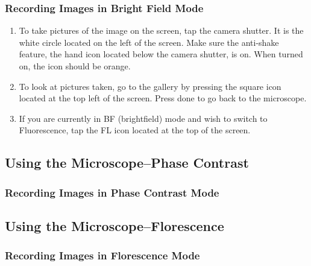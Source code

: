 \documentclass{article}
\begin{document}
\subsubsection{Recording Images in Bright Field Mode}

\begin{enumerate}
  \item To take pictures of the image on the screen, tap the camera shutter. It is the white circle located on the left of the screen. Make sure the anti-shake feature, the hand icon located below the camera shutter, is on. When turned on, the icon should be orange.
  \item To look at pictures taken, go to the gallery by pressing the square icon located at the top left of the screen. Press done to go back to the microscope. 
  \item If you are currently in BF (brightfield) mode and wish to switch to Fluorescence, tap the FL icon located at the top of the screen.  
\end{enumerate}


\subsection{Using the Microscope--Phase Contrast}

\subsubsection{Recording Images in Phase Contrast Mode}



\subsection{Using the Microscope--Florescence}



\subsubsection{Recording Images in Florescence Mode}
\end{document}
